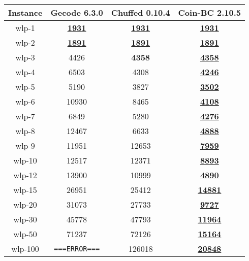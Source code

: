 \documentclass{article}
\newcommand{\ERR}{\texttt{===ERROR===}}
\newcommand{\sol}[1]{#1}
\newcommand{\opt}[1]{\textbf{#1}}
\newcommand{\proved}[1]{\textbf{\underline{#1}}}
\begin{document}
\begin{table}[H]
    \begin{center}
        \begin{tabular}{|c|c|c|c|}
            \hline
            \textbf{Instance}&\textbf{Gecode 6.3.0}&\textbf{Chuffed 0.10.4}&\textbf{Coin-BC 2.10.5}  \\
            \hline
            wlp-1         &   \proved{1931}   &     \proved{1931}   &   \proved{1931}   \\
            \hline
            wlp-2         &   \proved{1891}   &     \proved{1891}   &   \proved{1891}   \\
            \hline
            wlp-3         &   \sol{4426}      &     \opt{4358}      &   \proved{4358}   \\
            \hline
            wlp-4         &   \sol{6503}      &     \sol{4308}      &   \proved{4246}   \\
            \hline
            wlp-5         &   \sol{5190}      &     \sol{3827}      &   \proved{3502}   \\
            \hline
            wlp-6         &   \sol{10930}     &     \sol{8465}      &   \proved{4108}   \\
            \hline
            wlp-7         &   \sol{6849}      &     \sol{5280}      &   \proved{4276}   \\
            \hline
            wlp-8         &   \sol{12467}     &     \sol{6633}      &   \proved{4888}   \\
            \hline
            wlp-9         &   \sol{11951}     &     \sol{12653}     &   \proved{7959}   \\
            \hline
            wlp-10        &   \sol{12517}     &     \sol{12371}     &   \proved{8893}   \\
            \hline
            wlp-12        &   \sol{13900}     &     \sol{10999}     &   \proved{4890}   \\
            \hline
            wlp-15        &   \sol{26951}     &     \sol{25412}     &   \proved{14881}  \\
            \hline
            wlp-20        &   \sol{31073}     &     \sol{27733}     &   \proved{9727}   \\
            \hline
            wlp-30        &   \sol{45778}     &     \sol{47793}     &   \proved{11964}  \\
            \hline
            wlp-50        &   \sol{71237}     &     \sol{72126}     &   \proved{15164}  \\
            \hline
            wlp-100       &   \ERR            &     \sol{126018}    &   \proved{20848}  \\
            \hline
        \end{tabular}
    \end{center}
\end{table}
\end{document}

